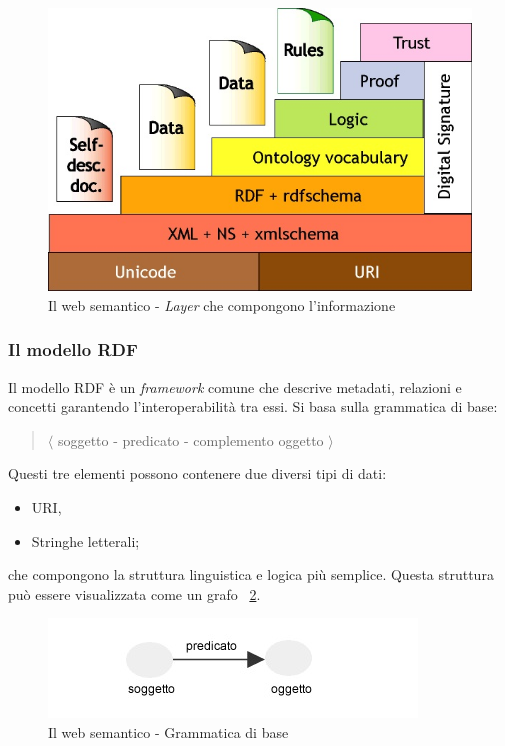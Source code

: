 			\begin{figure}
				\centering
				\includegraphics[scale=0.5]{images/LInformazioneEIlWebSemantico-WebSemantico1}
				\caption{Il web semantico - \emph{Layer} che compongono l'informazione}
				\label{fig:LInformazioneEIlWebSemantico-WebSemantico}
			\end{figure}			
			
			\subsubsection{Il modello RDF}
				Il modello RDF è un \emph{framework} comune che descrive metadati, relazioni e concetti garantendo l'interoperabilità tra essi. Si basa sulla grammatica di base:
				\begin{quote}
					$\langle$ soggetto - predicato - complemento oggetto $\rangle$
				\end{quote}
				Questi tre elementi possono contenere due diversi tipi di dati:
					\begin{itemize}
						\item URI,
						\item Stringhe letterali;
					\end{itemize}
				che compongono la struttura linguistica e logica più semplice. Questa struttura può essere visualizzata come un grafo ~\ref{fig:LInformazioneEIlWebSemantico-RDF1}.
				
				\begin{figure}
				\centering
					\includegraphics[scale=0.8]{images/LInformazioneEIlWebSemantico-RDF1}
					\caption{Il web semantico - Grammatica di base}
					\label{fig:LInformazioneEIlWebSemantico-RDF1}
				\end{figure}
				
